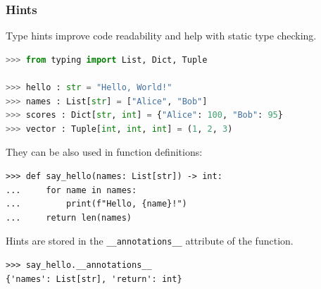 \documentclass[envcountsect,10pt]{beamer}
\begin{document}
\begin{frame}[fragile]
    \frametitle{Hints}

    Type hints improve code readability and help with static type checking.

    \begin{lstlisting}[language=Python]
>>> from typing import List, Dict, Tuple

>>> hello : str = "Hello, World!"
>>> names : List[str] = ["Alice", "Bob"]
>>> scores : Dict[str, int] = {"Alice": 100, "Bob": 95}
>>> vector : Tuple[int, int, int] = (1, 2, 3)
    \end{lstlisting}

    They can be also used in function definitions:

    \begin{lstlisting}
>>> def say_hello(names: List[str]) -> int:
...     for name in names:
...         print(f"Hello, {name}!")
...     return len(names)
    \end{lstlisting}

    Hints are stored in the \texttt{\_\_annotations\_\_} attribute of the function.


    \begin{lstlisting}
>>> say_hello.__annotations__
{'names': List[str], 'return': int}
    \end{lstlisting}
\end{frame}
\end{document}
